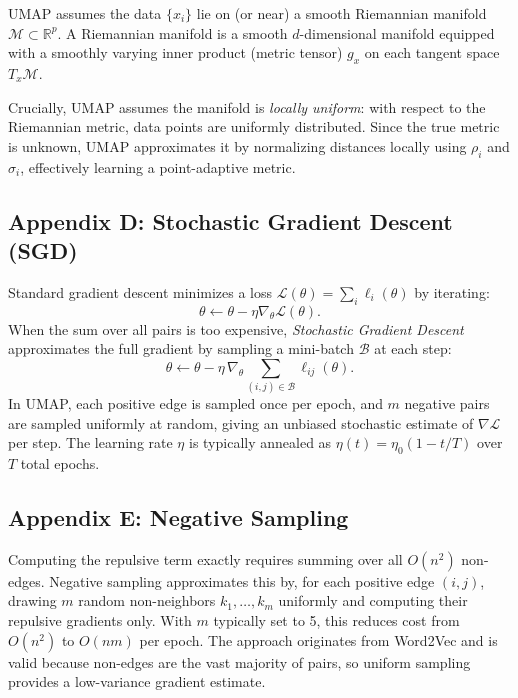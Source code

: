 \documentclass[11pt]{article}
\begin{document}
UMAP assumes the data $\{x_i\}$ lie on (or near) a smooth Riemannian manifold $\mathcal{M} \subset \mathbb{R}^p$. A Riemannian manifold is a smooth $d$-dimensional manifold equipped with a smoothly varying inner product (metric tensor) $g_x$ on each tangent space $T_x\mathcal{M}$.

Crucially, UMAP assumes the manifold is \emph{locally uniform}: with respect to the Riemannian metric, data points are uniformly distributed. Since the true metric is unknown, UMAP approximates it by normalizing distances locally using $\rho_i$ and $\sigma_i$, effectively learning a point-adaptive metric.

\subsection*{Appendix D: Stochastic Gradient Descent (SGD)}\label{app:sgd}

Standard gradient descent minimizes a loss $\mathcal{L}(\theta) = \sum_i \ell_i(\theta)$ by iterating:
\[
  \theta \leftarrow \theta - \eta \nabla_\theta \mathcal{L}(\theta).
\]
When the sum over all pairs is too expensive, \emph{Stochastic Gradient Descent} approximates the full gradient by sampling a mini-batch $\mathcal{B}$ at each step:
\[
  \theta \leftarrow \theta - \eta \, \nabla_\theta \sum_{(i,j) \in \mathcal{B}} \ell_{ij}(\theta).
\]
In UMAP, each positive edge is sampled once per epoch, and $m$ negative pairs are sampled uniformly at random, giving an unbiased stochastic estimate of $\nabla \mathcal{L}$ per step. The learning rate $\eta$ is typically annealed as $\eta(t) = \eta_0 (1 - t/T)$ over $T$ total epochs.

\subsection*{Appendix E: Negative Sampling}\label{app:negsampling}

Computing the repulsive term exactly requires summing over all $O(n^2)$ non-edges. Negative sampling approximates this by, for each positive edge $(i,j)$, drawing $m$ random non-neighbors $k_1, \ldots, k_m$ uniformly and computing their repulsive gradients only. With $m$ typically set to 5, this reduces cost from $O(n^2)$ to $O(n m)$ per epoch. The approach originates from Word2Vec and is valid because non-edges are the vast majority of pairs, so uniform sampling provides a low-variance gradient estimate.
\end{document}

